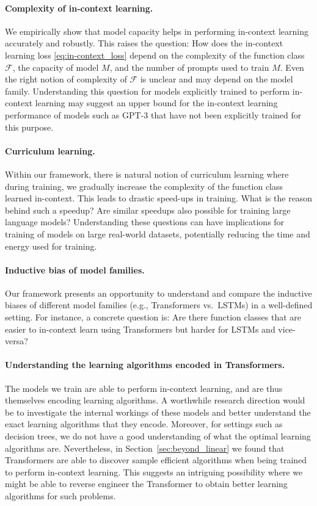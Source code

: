 \documentclass{article}
\begin{document}
\paragraph{Complexity of in-context learning.} We empirically show that model capacity helps in performing in-context learning accurately and robustly. This raises the question: How does the in-context learning loss \eqref{eq:in-context_loss} depend on the complexity of the function class $\mathcal{F}$, the capacity of model $M$, and the number of prompts used to train $M$. Even the right notion of complexity of $\mathcal{F}$ is unclear and may depend on the model family. Understanding this question for models explicitly trained to perform in-context learning may suggest an upper bound for the in-context learning performance of models such as GPT-3 that have not been explicitly trained for this purpose.

\paragraph{Curriculum learning.} Within our framework, there is natural notion of curriculum learning where during training, we gradually increase the complexity of the function class learned in-context. This leads to drastic speed-ups in training. What is the reason behind such a speedup? Are similar speedups also possible for training large language models? Understanding these questions can have implications for training of models on large real-world datasets, potentially reducing the time and energy used for training.

\paragraph{Inductive bias of model families.} Our framework presents an opportunity to understand and compare the inductive biases of different model families (e.g., Transformers vs.\ LSTMs) in a well-defined setting. For instance, a concrete question is: Are there function classes that are easier to in-context learn using Transformers but harder for LSTMs and vice-versa?

\paragraph{Understanding the learning algorithms encoded in Transformers.}
The models we train are able to perform in-context learning, and are thus themselves encoding learning algorithms. A worthwhile research
direction would be to investigate the internal workings of these models and better understand the exact
learning algorithms that they encode.
Moreover, for settings such as decision trees, we do not have a good understanding of what the optimal learning algorithms are.
Nevertheless, in Section~\ref{sec:beyond_linear} we found that Transformers are able to discover sample efficient algorithms when being trained to perform in-context learning.
This suggests an intriguing possibility where we might be able to reverse engineer the Transformer to obtain better learning algorithms for such problems.
\end{document}
